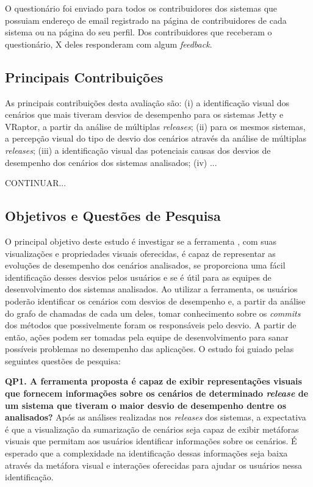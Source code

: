 O questionário foi enviado para todos os contribuidores dos sistemas que possuiam endereço de email registrado na página de contribuidores de cada sistema ou na página do seu perfil. Dos contribuidores que receberam o questionário, X deles responderam com algum \textit{feedback}.

\subsection{Principais Contribuições} \label{subsec:avaliacao-principais-contribuicoes}

As principais contribuições desta avaliação são: (i) a identificação visual dos cenários que mais tiveram desvios de desempenho para os sistemas Jetty e VRaptor, a partir da análise de múltiplas \textit{releases}; (ii) para os mesmos sistemas, a percepção visual do tipo de desvio dos cenários através da análise de múltiplas \textit{releases}; (iii) a identificação visual das potenciais causas dos desvios de desempenho dos cenários dos sistemas analisados; (iv) ...

{\color{red}CONTINUAR...}

\subsection{Objetivos e Questões de Pesquisa} \label{subsec:avaliacao-objetivos-questoes-pesquisa}

O principal objetivo deste estudo é investigar se a ferramenta \textit{\toolName}, com suas visualizações e propriedades visuais oferecidas, é capaz de representar as evoluções de desempenho dos cenários analisados, se proporciona uma fácil identificação desses desvios pelos usuários e se é útil para as equipes de desenvolvimento dos sistemas analisados. Ao utilizar a ferramenta, os usuários poderão identificar os cenários com desvios de desempenho e, a partir da análise do grafo de chamadas de cada um deles, tomar conhecimento sobre os \textit{commits} dos métodos que possivelmente foram os responsáveis pelo desvio. A partir de então, ações podem ser tomadas pela equipe de desenvolvimento para sanar possíveis problemas no desempenho das aplicações. O estudo foi guiado pelas seguintes questões de pesquisa:

\textbf{QP1. A ferramenta proposta é capaz de exibir representações visuais que fornecem informações sobre os cenários de determinado \textit{release} de um sistema que tiveram o maior desvio de desempenho dentre os analisados?} Após as análises realizadas nos \textit{releases} dos sistemas, a expectativa é que a visualização da sumarização de cenários seja capaz de exibir metáforas visuais que permitam aos usuários identificar informações sobre os cenários. É esperado que a complexidade na identificação dessas informações seja baixa através da metáfora visual e interações oferecidas para ajudar os usuários nessa identificação.


